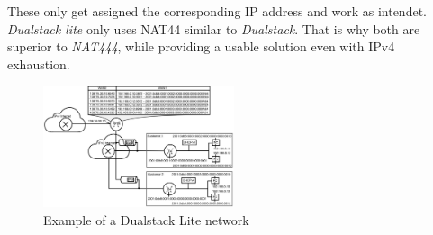 \documentclass[format=sigconf, natbib=true, nonacm=true]{acmart}
\begin{document}
These only get assigned the corresponding IP address and work as intendet. \textit{Dualstack lite} only uses NAT44 similar to \textit{Dualstack}. That is why both are superior to \textit{NAT444}, while providing a usable solution even with IPv4 exhaustion\cite{Hughes2022_C08}.
    \begin{figure}
        \centering
        \includegraphics[width=0.5\textwidth]{images/dualstack_lite_network.png}
        \caption{Example of a Dualstack Lite network}
        \label{fig:dualstack_lite_network}
    \end{figure}
\end{document}
